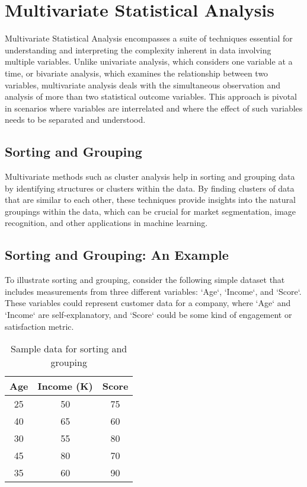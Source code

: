 \documentclass[a4paper,12pt]{book}
\begin{document}
\chapter{Multivariate Statistical Analysis}
\label{chap:multivariate_statistical_analysis}

Multivariate Statistical Analysis encompasses a suite of techniques essential for understanding and interpreting the complexity inherent in data involving multiple variables. Unlike univariate analysis, which considers one variable at a time, or bivariate analysis, which examines the relationship between two variables, multivariate analysis deals with the simultaneous observation and analysis of more than two statistical outcome variables. This approach is pivotal in scenarios where variables are interrelated and where the effect of such variables needs to be separated and understood.

\section{Sorting and Grouping}
Multivariate methods such as cluster analysis help in sorting and grouping data by identifying structures or clusters within the data. By finding clusters of data that are similar to each other, these techniques provide insights into the natural groupings within the data, which can be crucial for market segmentation, image recognition, and other applications in machine learning.

\section{Sorting and Grouping: An Example}
To illustrate sorting and grouping, consider the following simple dataset that includes measurements from three different variables: `Age`, `Income`, and `Score`. These variables could represent customer data for a company, where `Age` and `Income` are self-explanatory, and `Score` could be some kind of engagement or satisfaction metric.

\begin{table}[h]
\centering
\begin{tabular}{c c c}
\hline
\textbf{Age} & \textbf{Income (K)} & \textbf{Score} \\
\hline
25 & 50 & 75 \\
40 & 65 & 60 \\
30 & 55 & 80 \\
45 & 80 & 70 \\
35 & 60 & 90 \\
\hline
\end{tabular}
\caption{Sample data for sorting and grouping}
\label{tab:sample_data}
\end{table}
\end{document}
